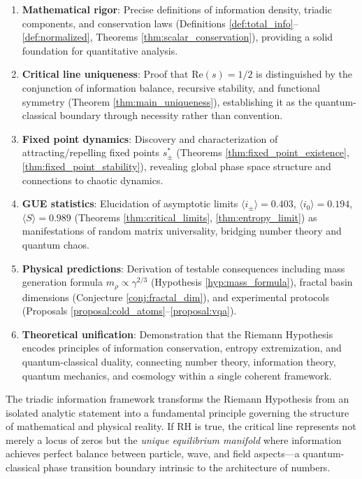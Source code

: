\documentclass[12pt]{article}
\theoremstyle{plain}
\theoremstyle{definition}
\begin{document}
\begin{enumerate}
\item \textbf{Mathematical rigor}: Precise definitions of information density, triadic components, and conservation laws (Definitions \ref{def:total_info}--\ref{def:normalized}, Theorems \ref{thm:scalar_conservation}), providing a solid foundation for quantitative analysis.

\item \textbf{Critical line uniqueness}: Proof that $\text{Re}(s) = 1/2$ is distinguished by the conjunction of information balance, recursive stability, and functional symmetry (Theorem \ref{thm:main_uniqueness}), establishing it as the quantum-classical boundary through necessity rather than convention.

\item \textbf{Fixed point dynamics}: Discovery and characterization of attracting/repelling fixed points $s_\pm^*$ (Theorems \ref{thm:fixed_point_existence}, \ref{thm:fixed_point_stability}), revealing global phase space structure and connections to chaotic dynamics.

\item \textbf{GUE statistics}: Elucidation of asymptotic limits $\langle i_\pm \rangle = 0.403$, $\langle i_0 \rangle = 0.194$, $\langle S \rangle = 0.989$ (Theorems \ref{thm:critical_limits}, \ref{thm:entropy_limit}) as manifestations of random matrix universality, bridging number theory and quantum chaos.

\item \textbf{Physical predictions}: Derivation of testable consequences including mass generation formula $m_\rho \propto \gamma^{2/3}$ (Hypothesis \ref{hyp:mass_formula}), fractal basin dimensions (Conjecture \ref{conj:fractal_dim}), and experimental protocols (Proposals \ref{proposal:cold_atoms}--\ref{proposal:vqa}).

\item \textbf{Theoretical unification}: Demonstration that the Riemann Hypothesis encodes principles of information conservation, entropy extremization, and quantum-classical duality, connecting number theory, information theory, quantum mechanics, and cosmology within a single coherent framework.
\end{enumerate}

The triadic information framework transforms the Riemann Hypothesis from an isolated analytic statement into a fundamental principle governing the structure of mathematical and physical reality. If RH is true, the critical line represents not merely a locus of zeros but the \emph{unique equilibrium manifold} where information achieves perfect balance between particle, wave, and field aspects—a quantum-classical phase transition boundary intrinsic to the architecture of numbers.
\end{document}
